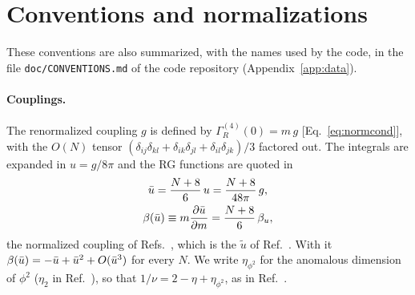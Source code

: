 \appendix

\section{Conventions and normalizations}
\label{app:conventions}

These conventions are also summarized, with the names used by the code, in the file \texttt{doc/CONVENTIONS.md} of
the code repository (Appendix~\ref{app:data}).

\paragraph{Couplings.}
The renormalized coupling $g$ is defined by $\Gamma^{(4)}_R(0)=m\,g$ [Eq.~\eqref{eq:normcond}], with the $O(N)$ tensor
$(\delta_{ij}\delta_{kl}+\delta_{ik}\delta_{jl}+\delta_{il}\delta_{jk})/3$ factored out. The integrals are expanded in
$u=g/8\pi$ and the RG functions are quoted in
\begin{gather}
\bar u=\frac{N+8}{6}\,u=\frac{N+8}{48\pi}\,g ,\nonumber\\
\beta(\bar u)\equiv m\frac{\partial\bar u}{\partial m}=\frac{N+8}{6}\,\beta_u ,
\label{eq:ubar}
\end{gather}
the normalized coupling of Refs.~\cite{BNGM1976,BNM1978}, which is the $\tilde u$ of Ref.~\cite{Phi4tools2024}. With
it $\beta(\bar u)=-\bar u+\bar u^2+O(\bar u^3)$ for every $N$. We write $\eta_{\phi^2}$ for the anomalous dimension of $\phi^2$ ($\eta_2$ in
Ref.~\cite{Ribeca2003thesis}), so that $1/\nu=2-\eta+\eta_{\phi^2}$, as in Ref.~\cite{Phi4tools2024}.

